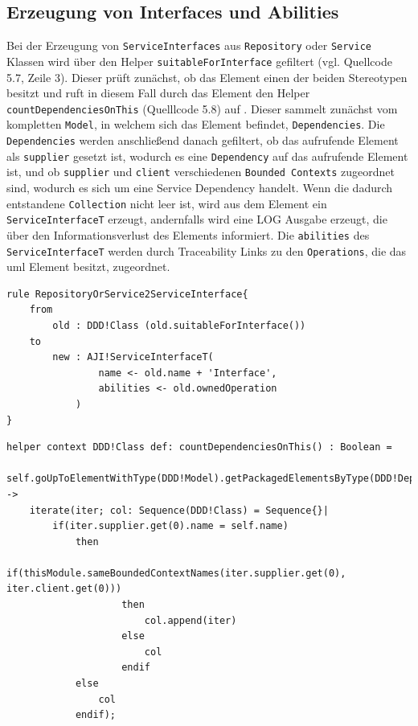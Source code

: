 \documentclass[
	oneside,  %
	ngerman, 
	final, 
	11pt, 
	a4paper, 
	1.1headlines, 
	headinclude=false, 
	footinclude=false, 
	mpinclude=false, 
	pagesize, 
	onecolumn, 
	titlepage, 
	parskip=half, 
	headsepline, 
	chapterprefix=false, 
	version=first, 
	listof=totoc, 
	bibliography=totoc, 
	toc=graduated, 
	fleqn
]{scrbook}
\begin{document}
\subsection{Erzeugung von Interfaces und Abilities}
Bei der Erzeugung von \texttt{ServiceInterfaces} aus \texttt{Repository} oder \texttt{Service} Klassen wird über den Helper \texttt{suitableForInterface} gefiltert (vgl. Quellcode 5.7, Zeile 3). Dieser prüft zunächst, ob das Element einen der beiden Stereotypen besitzt und ruft in diesem Fall durch das Element den Helper \texttt{countDependenciesOnThis} (Quelllcode 5.8) auf . Dieser sammelt zunächst vom kompletten \texttt{Model}, in welchem sich das Element befindet, \texttt{Dependencies}. Die \texttt{Dependencies} werden anschließend danach gefiltert, ob das aufrufende Element als \texttt{supplier} gesetzt ist, wodurch es eine \texttt{Dependency} auf das aufrufende Element ist, und ob \texttt{supplier} und \texttt{client} verschiedenen \texttt{Bounded Contexts} zugeordnet sind, wodurch es sich um eine Service Dependency handelt. Wenn die dadurch entstandene \texttt{Collection} nicht leer ist, wird aus dem Element ein \texttt{ServiceInterfaceT} erzeugt, andernfalls wird eine LOG Ausgabe erzeugt, die über den Informationsverlust des Elements informiert. Die \texttt{abilities} des \texttt{ServiceInterfaceT} werden durch Traceability Links zu den \texttt{Operations}, die das \ac{uml} Element besitzt, zugeordnet.
\begin{lstlisting}[caption={Regel zur Erzeugung eines Service Interface},captionpos=b,label=Quellcode:RepositoryOrService2ServiceInterface] 
rule RepositoryOrService2ServiceInterface{
	from
		old : DDD!Class (old.suitableForInterface())
	to
		new : AJI!ServiceInterfaceT(
				name <- old.name + 'Interface',
				abilities <- old.ownedOperation
			)
}
\end{lstlisting}
\begin{lstlisting}[caption={Helper zum Zählen von Interface Dependencies},captionpos=b,label=Quellcode:countDependenciesOnThis] 
helper context DDD!Class def: countDependenciesOnThis() : Boolean =
	self.goUpToElementWithType(DDD!Model).getPackagedElementsByType(DDD!Dependency) -> 
	iterate(iter; col: Sequence(DDD!Class) = Sequence{}|
		if(iter.supplier.get(0).name = self.name)
			then
				if(thisModule.sameBoundedContextNames(iter.supplier.get(0), iter.client.get(0)))
					then
						col.append(iter)
					else
						col
					endif
			else
				col
			endif);
\end{lstlisting}
\end{document}
